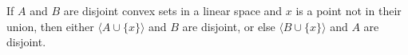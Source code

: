 If $A$ and $B$ are disjoint convex sets in a linear space and $x$ is a point not in their union, then either $\langle A \cup \{x\} \rangle$ and $B$ are disjoint, or else $\langle B \cup \{x\} \rangle$ and $A$ are disjoint.
